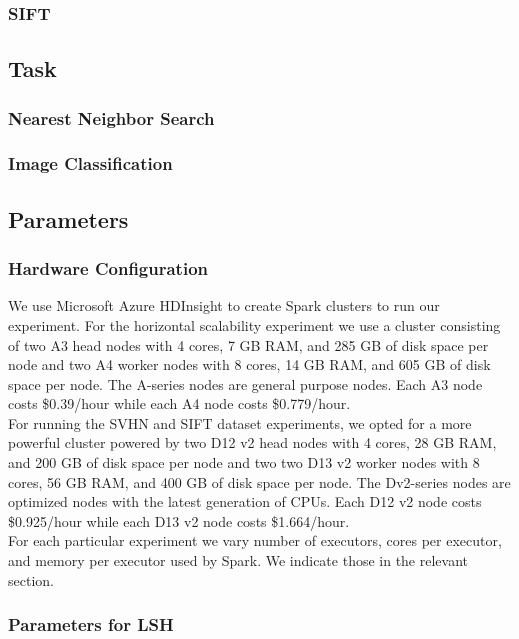 \documentclass[letterpaper,twocolumn,10pt]{article}
\theoremstyle{definition}
\begin{document}
\subsubsection{SIFT}
\cite{jegou2011product}

\subsection{Task}
\subsubsection{Nearest Neighbor Search}
\subsubsection{Image Classification}
\subsection{Parameters}
\subsubsection{Hardware Configuration}

We use Microsoft Azure HDInsight to create Spark clusters to run our 
experiment. For the horizontal scalability experiment we use a cluster consisting 
of two A3 head nodes with 4 cores, 7 GB RAM, and 285 GB of disk space per node and 
two A4 worker nodes with 8 cores, 14 GB RAM, and 605 GB of disk space per node. The 
A-series nodes are general purpose nodes. Each A3 node costs \$0.39/hour while each 
A4 node costs \$0.779/hour. \\

For running the SVHN and SIFT dataset experiments, we opted for a more powerful 
cluster powered by two D12 v2 head nodes with 4 cores, 28 GB RAM, and 200 GB of 
disk space per node and two two D13 v2 worker nodes with 8 cores, 56 GB RAM, and 
400 GB of disk space per node. The Dv2-series nodes are optimized nodes with the 
latest generation of CPUs. Each D12 v2 node costs \$0.925/hour while each D13 v2 
node costs \$1.664/hour. \\

For each particular experiment we vary number of executors, cores per executor, and 
memory per executor used by Spark. We indicate those in the relevant section.

\subsubsection{Parameters for LSH}
\end{document}
